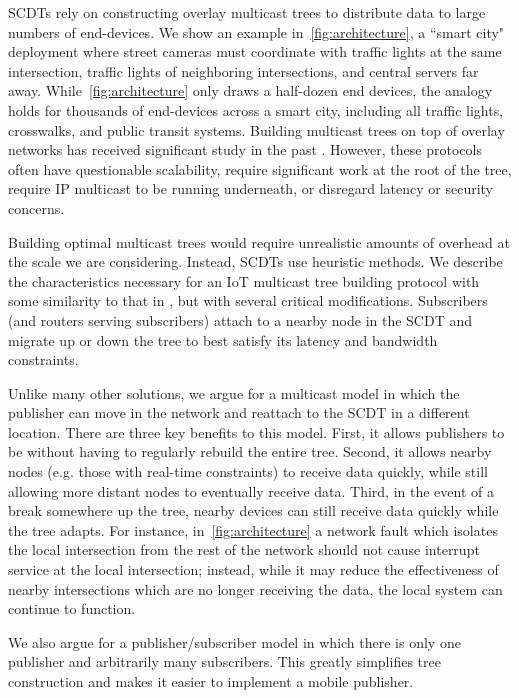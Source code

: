 SCDTs rely on constructing overlay multicast trees to distribute data to
large numbers of end-devices.  We show an example in~\autoref{fig:architecture}, a 
``smart city"
deployment where street cameras must coordinate with traffic lights at the same
intersection, traffic lights of neighboring intersections, and central servers
far away.  While~\autoref{fig:architecture} only draws a half-dozen end devices, 
the analogy holds
for thousands of end-devices across a smart city, including all traffic lights,
crosswalks, and public transit systems.  Building multicast trees on top of
overlay networks has received significant study in the past \cite{overcast,
	scribe, pgm}.  However, these protocols often have questionable scalability, require significant work at the root of the tree, require IP multicast to be running underneath, or disregard latency or security concerns.

Building optimal multicast trees would require unrealistic amounts of overhead
at the scale we are considering.  Instead, SCDTs use heuristic methods.  We describe the characteristics necessary for an IoT
multicast tree building protocol with some similarity to that in
\cite{overcast}, but with several critical modifications.  Subscribers (and
routers serving subscribers) attach to a nearby node in the SCDT and
migrate up or down the tree to best satisfy its latency and bandwidth
constraints.

Unlike many other solutions, we argue for a multicast model in which the
publisher can move in the network and reattach to the SCDT in a different
location.  There are three key benefits to this model.  First, it allows
publishers to be  without having to regularly rebuild the entire tree.
Second, it allows nearby nodes (e.g. those with real-time constraints) to
receive data quickly, while still allowing more distant nodes to eventually
receive data.  Third, in the event of a break somewhere up the tree, nearby
devices can still receive data quickly while the tree adapts.  For instance, 
in~\autoref{fig:architecture} a network fault which isolates the local 
intersection from the rest of
the network should not cause interrupt service at the local intersection; instead, while
it may reduce the effectiveness of nearby intersections which are no longer
receiving the data, the local system can continue to function.

We also argue for a publisher/subscriber model in which there is only one
publisher and arbitrarily many subscribers. This greatly simplifies tree
construction and makes it easier to implement a mobile publisher.

